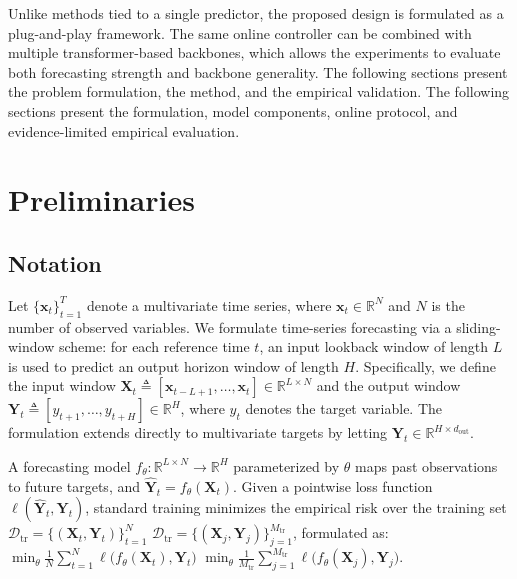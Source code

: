 ﻿\documentclass[journal]{IEEEtran}
\DeclareRobustCommand{\oldtext}[1]{{\color{revisionred}#1}}
\DeclareRobustCommand{\newtext}[1]{{\color{revisionblue}#1}}
\DeclareRobustCommand{\why}[1]{{\color{revisionblue}{\footnotesize (#1)}}}
\DeclareRobustCommand{\rw}[3]{\oldtext{#1} \newtext{#2}\why{#3}}
\begin{document}
Unlike methods tied to a single predictor, the proposed design is formulated as a plug-and-play framework. The same online controller can be combined with multiple transformer-based backbones, which allows the experiments to evaluate both forecasting strength and backbone generality. \rw{The following sections present the problem formulation, the method, and the empirical validation.}{The following sections present the formulation, model components, online protocol, and evidence-limited empirical evaluation.}{承认当前证据范围，降低“validation”过强语气。}

\section{Preliminaries}
\subsection{Notation}
Let $\{\mathbf{x}_t\}_{t=1}^{T}$ denote a multivariate time series, where $\mathbf{x}_t \in \mathbb{R}^{N}$ and $N$ is the number of observed variables. We formulate time-series forecasting via a sliding-window scheme: for each reference time $t$, an input lookback window of length $L$ is used to predict an output horizon window of length $H$. Specifically, we define the input window $\mathbf{X}_t \triangleq [\mathbf{x}_{t-L+1},\ldots,\mathbf{x}_t] \in \mathbb{R}^{L \times N}$ and the output window $\mathbf{Y}_t \triangleq [y_{t+1},\ldots,y_{t+H}] \in \mathbb{R}^{H}$, where $y_t$ denotes the target variable. The formulation extends directly to multivariate targets by letting $\mathbf{Y}_t \in \mathbb{R}^{H \times d_{\mathrm{out}}}$.

A forecasting model $f_{\theta}: \mathbb{R}^{L \times N} \rightarrow \mathbb{R}^{H}$ parameterized by $\theta$ maps past observations to future targets, and $\widehat{\mathbf{Y}}_t = f_{\theta}(\mathbf{X}_t)$. Given a pointwise loss function $\ell(\widehat{\mathbf{Y}}_t,\mathbf{Y}_t)$, standard training minimizes the empirical risk over the training set \rw{$\mathcal{D}_{\mathrm{tr}}=\{(\mathbf{X}_t,\mathbf{Y}_t)\}_{t=1}^{N}$}{$\mathcal{D}_{\mathrm{tr}}=\{(\mathbf{X}_j,\mathbf{Y}_j)\}_{j=1}^{M_{\mathrm{tr}}}$}{避免与变量数 $N$ 冲突，用 $M_{\mathrm{tr}}$ 表示训练窗口样本数。}, formulated as:  \rw{$\min_{\theta}\frac{1}{N}\sum_{t=1}^{N}\ell\big(f_{\theta}(\mathbf{X}_t),\mathbf{Y}_t\big)$}{$\min_{\theta}\frac{1}{M_{\mathrm{tr}}}\sum_{j=1}^{M_{\mathrm{tr}}}\ell\big(f_{\theta}(\mathbf{X}_j),\mathbf{Y}_j\big)$}{同步修正经验风险中的样本数记号。}.
\end{document}
